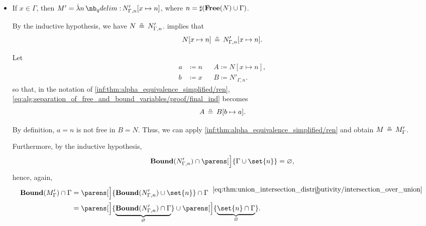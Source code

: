 \begin{defproof}
\begin{itemize}
\begin{itemize}
      \item If \( x \in \Gamma \), then \( M' = \qabs n N'_{\Gamma,n}[x \mapsto n] \), where \( n = \sharp(\op*{Free}(N) \cup \Gamma) \).

      By the inductive hypothesis, we have \( N \aequiv N'_{\Gamma,n} \).  implies that
      \begin{equation}\label{eq:alg:separation_of_free_and_bound_variables/proof/final_ind}
        N[x \mapsto n] \aequiv N'_{\Gamma,n}[x \mapsto n].
      \end{equation}

      Let
      \begin{align*}
        a &\coloneqq n && A \coloneqq N[x \mapsto n], \\
        b &\coloneqq x && B \coloneqq N'_{\Gamma,n}.
      \end{align*}
      so that, in the notation of \ref{inf:thm:alpha_equivalence_simplified/ren}, \eqref{eq:alg:separation_of_free_and_bound_variables/proof/final_ind} becomes
      \begin{equation*}
        A \aequiv B[b \mapsto a].
      \end{equation*}

      By definition, \( a = n \) is not free in \( B = N \). Thus, we can apply \ref{inf:thm:alpha_equivalence_simplified/ren} and obtain \( M \aequiv M'_\Gamma \).

      Furthermore, by the inductive hypothesis,
      \begin{equation*}
        \op*{Bound}(N'_{\Gamma,n}) \cap \parens[\Big]{ \Gamma \cup \set{ n } } = \varnothing,
      \end{equation*}
      hence, again,
      \begin{align*}
        \op*{Bound}(M'_\Gamma) \cap \Gamma
        &=
        \parens[\Big]{ \op*{Bound}(N'_{\Gamma,n}) \cup \set{ n } } \cap \Gamma
        \reloset {\eqref{eq:thm:union_intersection_distributivity/intersection_over_union}} = \\ &=
        \parens[\Big]{ \underbrace{\op*{Bound}(N'_{\Gamma,n}) \cap \Gamma }_\varnothing } \cup \parens[\Big]{ \underbrace{\set{ n } \cap \Gamma}_\varnothing }.
      \end{align*}
    \end{itemize}
  \end{itemize}
\end{defproof}
